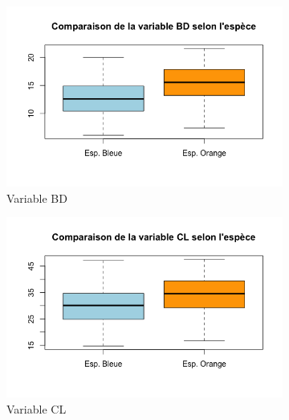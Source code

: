 \documentclass[a4paper,11pt]{report}
\begin{document}
\begin{figure}[H]
	\centering
	\captionsetup{justification=centering, margin=2cm}
	\begin{subfigure}[b]{0.3\linewidth}
		\centering
		\captionsetup{justification=centering, margin=1cm}
		\includegraphics[width=1\linewidth]{img/1-2-1-espece-bd.png}
		\caption{\scriptsize Variable BD}
		\label{fig:1_2_1_espece_bd}
	\end{subfigure}%
	\begin{subfigure}[b]{0.3\linewidth}
		\centering
		\captionsetup{justification=centering, margin=1cm}
		\includegraphics[width=1\linewidth]{img/1-2-1-espece-cl.png}
		\caption{\scriptsize Variable CL}
		\label{fig:1_2_1_espece_cl}
	\end{subfigure}%
	\begin{subfigure}[b]{0.3\linewidth}
		\centering
		\captionsetup{justification=centering, margin=1cm}

\end{subfigure}
\end{figure}
\end{document}
